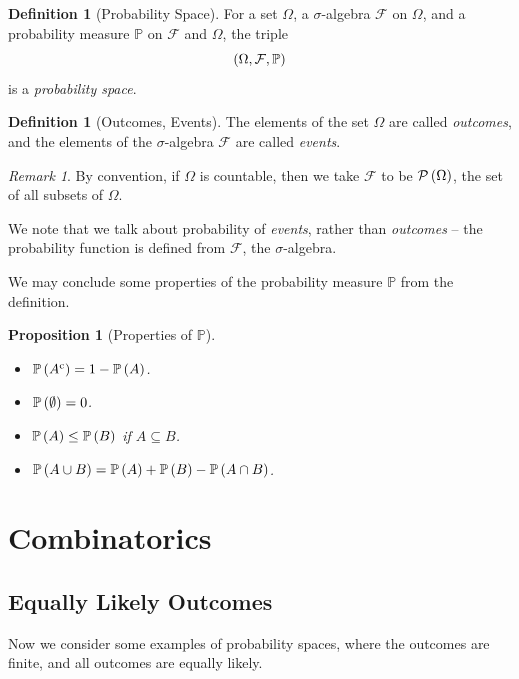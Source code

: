 \documentclass{article}
\newtheorem{proposition}[theorem]{Proposition}
\theoremstyle{definition}
\newtheorem{definition}[theorem]{Definition}
\theoremstyle{remark}
\newtheorem{remark}[theorem]{Remark}
\newcommand{\Prob}{\mathbb{P}}
\newcommand{\eventSpace}{\mathcal{F}}
\newcommand{\powerset}{\mathcal{P}}
\newcommand{\compl}{^{\mathrm{c}}}
\begin{document}
\begin{definition}[Probability Space]
    \label{def:probability-space}%
    For a set \(\Omega\), a \(\sigma\)-algebra \(\eventSpace\) on \(\Omega\), and a probability measure \(\Prob\) on \(\eventSpace\) and \(\Omega\), the triple
    \[
        \pqty{\Omega, \eventSpace, \Prob}
    \]
    is a \emph{probability space}.
\end{definition}

\begin{definition}[Outcomes, Events]
    \label{def:outcome-event}%
    The elements of the set \(\Omega\) are called \emph{outcomes}, and the elements of the \(\sigma\)-algebra \(\eventSpace\) are called \emph{events}.
\end{definition}

\begin{remark}
    By convention, if \(\Omega\) is countable, then we take \(\eventSpace\) to be \(\powerset\pqty{\Omega}\), the set of all subsets of \(\Omega\).
\end{remark}

We note that we talk about probability of \emph{events}, rather than \emph{outcomes} -- the probability function is defined from \(\eventSpace\), the \(\sigma\)-algebra.

We may conclude some properties of the probability measure \(\Prob\) from the definition.

\begin{proposition}[Properties of \(\Prob\)]
    \label{prop:properties-prob}%
    \begin{itemize}
        \item \(\Prob\pqty{A\compl} = 1 - \Prob\pqty{A}\).
        \item \(\Prob\pqty{\emptyset} = 0\).
        \item \(\Prob\pqty{A} \leq \Prob\pqty{B}\) if \(A \subseteq B\).
        \item \(\Prob\pqty{A \cup B} = \Prob\pqty{A} + \Prob\pqty{B} - \Prob\pqty{A \cap B}\).
    \end{itemize}
\end{proposition}

\section{Combinatorics}

\subsection{Equally Likely Outcomes}
Now we consider some examples of probability spaces, where the outcomes are finite, and all outcomes are equally likely.
\end{document}
